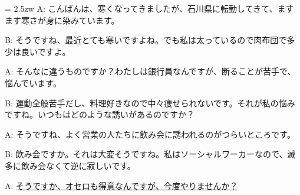 \documentclass[11pt]{amsart}
\title{}
\author{}
\newenvironment{hangall}[1]{\hangindent = 2.5zw\everypar{\hangindent = 2.5zw}}{}
\begin{document}
\maketitle
\begin{hangall}{}%
A: こんばんは、寒くなってきましたが、石川県に転勤してきて、ますます寒さが身に染みています。

B: そうですね、最近とても寒いですよね。でも私は太っているので肉布団で多少は良いですよ。

A: そんなに違うものですか？わたしは銀行員なんですが、断ることが苦手で、悩んでいます。

B: 運動全般苦手だし、料理好きなので中々痩せられないです。それが私の悩みですね。いつもはどのような誘いがあるのですか？

A: そうですね、よく営業の人たちに飲み会に誘われるのがつらいところです。

B: 飲み会ですか。それは大変そうですね。私はソーシャルワーカーなので、滅多に飲み会なくて逆に寂しいです。

A: \ul{そうですか、オセロも得意なんですが、今度やりませんか？}\end{hangall}
\end{document}
